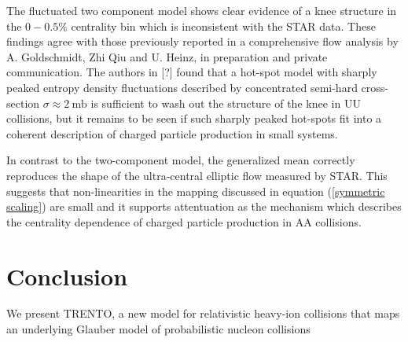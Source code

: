 \documentclass[aps,prl,reprint,amsmath,nofootinbib]{revtex4-1}
\begin{document}
The fluctuated two component model shows clear evidence of a knee structure in the $0-0.5\%$ centrality bin which is inconsistent with the STAR data. These findings agree 
with those previously reported in a comprehensive flow analysis by A. Goldschmidt, Zhi Qiu and U. Heinz, in preparation and private communication. The authors in [?] 
found that a hot-spot model with sharply peaked entropy density fluctuations described by concentrated semi-hard cross-section $\sigma \approx 2 ~\mathrm{mb}$ is sufficient to wash 
out the structure of the knee in UU collisions, but it remains to be seen if such sharply peaked hot-spots fit into a coherent description of charged particle production in 
small systems.

In contrast to the two-component model, the generalized mean correctly reproduces the shape of the ultra-central elliptic flow measured by STAR. This suggests that non-linearities
in the mapping discussed in equation (\ref{symmetric scaling}) are small and it supports attentuation as the mechanism which describes the centrality dependence of charged particle production
in AA collisions.


\section{Conclusion}

We present TRENTO, a new model for relativistic heavy-ion collisions that maps an underlying Glauber model of probabilistic nucleon collisions



\end{document}

